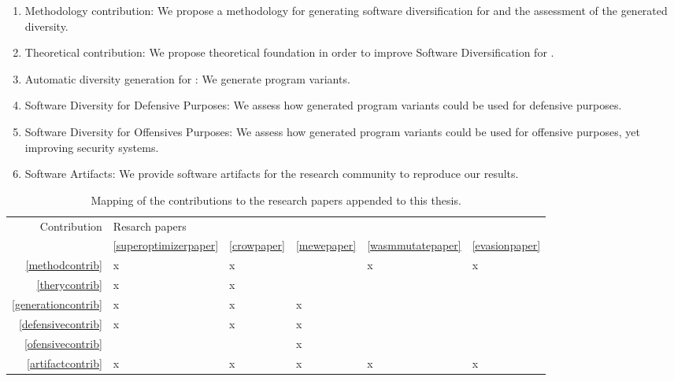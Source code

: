 \begin{enumerate}[label=\textbf{C\arabic*}:, ref=C\arabic*]
	\item \label{methodcontrib} Methodology contribution: We propose a methodology for generating software diversification for \Wasm and the assessment of the generated diversity.
	
	\item \label{therycontrib} Theoretical contribution: We propose theoretical foundation in order to improve Software Diversification for \Wasm.
	
	\item \label{generationcontrib} Automatic diversity generation for \Wasm: We generate \Wasm program variants.
	
	\item \label{defensivecontrib} Software Diversity for Defensive Purposes: We assess how generated \Wasm program variants could be used for defensive purposes.
	
	\item \label{ofensivecontrib} Software Diversity for Offensives Purposes: We assess how generated \Wasm program variants could be used for offensive purposes, yet improving security systems.
	
	\item \label{artifactcontrib} Software Artifacts: We provide software artifacts for the research community to reproduce our results.
\end{enumerate}


\begin{table}
	\begin{tabular}{r | l l l l l }
		Contribution & Resarch  papers \\
		& \ref{superoptimizerpaper} & \ref{crowpaper} & \ref{mewepaper} & \ref{wasmmutatepaper} & \ref{evasionpaper} \\
		\hline
		\ref{methodcontrib} & x & x &  & x & x \\
		\ref{therycontrib} & x & x &  &  &  \\
		\ref{generationcontrib} & x & x & x\\
		\ref{defensivecontrib} & x & x & x\\
		\ref{ofensivecontrib} & & & x\\
		\ref{artifactcontrib} & x & x & x & x & x
	\end{tabular}
	\label{contribmap}
	\caption{Mapping of the contributions to the research papers appended to this thesis.}
\end{table}

